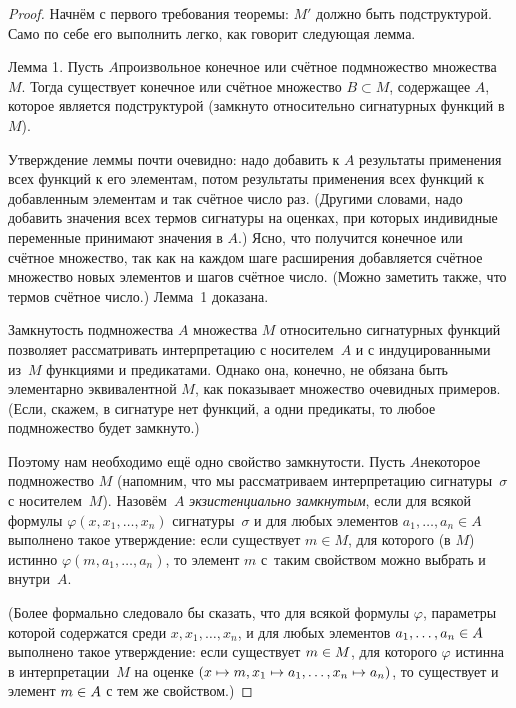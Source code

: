 \begin{proof}
Начнём с первого требования теоремы: $M'$ должно быть подструктурой.
Само по себе его выполнить легко, как говорит следующая лемма.

\textsf{Лемма 1}. Пусть $A$\т произвольное конечное или
счётное подмножество множества~$M$. Тогда существует конечное или счётное
множество $B\subset M$, содержащее $A$, которое является подструктурой
(замкнуто относительно сигнатурных функций в $M$).

Утверждение леммы почти очевидно: надо добавить к $A$ результаты
применения всех функций к его элементам, потом результаты
применения всех функций к добавленным элементам и так счётное
число раз. (Другими словами, надо добавить значения всех термов
сигнатуры на оценках, при которых индивидные переменные
принимают значения в $A$.) Ясно, что получится конечное или
счётное множество, так как на каждом шаге расширения добавляется
счётное множество новых элементов и шагов счётное число. (Можно
заметить также, что термов счётное число.) Лемма~1 доказана.

Замкнутость подмножества $A$ множества $M$ относительно
сигнатурных функций позволяет рассматривать интерпретацию с
носителем~$A$ и с индуцированными из~$M$ функциями и
предикатами. Однако она, конечно, не обязана быть элементарно
эквивалентной $M$, как показывает множество очевидных примеров.
(Если, скажем, в сигнатуре нет функций, а одни предикаты,
то любое подмножество будет замкнуто.)

Поэтому нам необходимо ещё одно свойство замкнутости. Пусть
$A$\т некоторое подмножество $M$ (напомним, что мы рассматриваем
интерпретацию сигнатуры~$\sigma$ с носителем~$M$). Назовём~$A$
\emph{экзистенциально замкнутым},%
%
если для всякой
формулы $\varphi(x,x_1,\dots,x_n)$ сигнатуры~$\sigma$ и для
любых элементов $a_1,\dots,a_n\in A$ выполнено такое
утверждение: если существует $m\in M$, для которого (в $M$)
истинно $\varphi(m,a_1,\dots,a_n)$, то элемент $m$ с~таким
свойством можно выбрать и внутри~$A$.

(Более формально следовало бы сказать, что для всякой формулы
$\varphi$, параметры которой содержатся среди $x,x_1,\dots,x_n$,
и для любых элементов $a_1,\dots,a_n\hm\in A$ выполнено такое
утверждение: если существует $m\hm\in M$, для которого $\varphi$
истинна в интерпретации~$M$ на оценке $(x\hm\mapsto m,x_1\hm\mapsto
a_1,\dots,x_n\hm\mapsto a_n)$, то существует и
элемент $m\hm\in A$ с тем же свойством.)


\end{proof}
